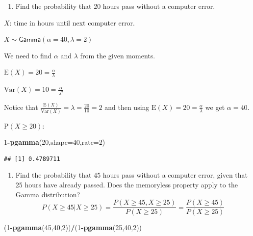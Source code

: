 \documentclass[
]{book}
\newenvironment{Shaded}{\begin{snugshade}}{\end{snugshade}}
\newcommand{\DataTypeTok}[1]{\textcolor[rgb]{0.13,0.29,0.53}{#1}}
\newcommand{\DecValTok}[1]{\textcolor[rgb]{0.00,0.00,0.81}{#1}}
\newcommand{\KeywordTok}[1]{\textcolor[rgb]{0.13,0.29,0.53}{\textbf{#1}}}
\newcommand{\NormalTok}[1]{#1}
\newcommand{\OperatorTok}[1]{\textcolor[rgb]{0.81,0.36,0.00}{\textbf{#1}}}
\providecommand{\tightlist}{%
  \setlength{\itemsep}{0pt}\setlength{\parskip}{0pt}}
\begin{document}
\begin{enumerate}
\def\labelenumi{\alph{enumi}.}
\tightlist
\item
  Find the probability that 20 hours pass without a computer error.
\end{enumerate}

\(X\): time in hours until next computer error.

\(X\sim \textsf{Gamma}(\alpha = 40, \lambda = 2)\)

We need to find \(\alpha\) and \(\lambda\) from the given moments.

\(\mbox{E}(X) = 20 = \frac{\alpha}{\lambda}\)

\(\mbox{Var}(X) = 10 = \frac{\alpha}{\lambda^2}\)

Notice that \(\frac{\mbox{E}(X)}{\mbox{Var}(X)} = \lambda = \frac{20}{10}=2\) and then using \(\mbox{E}(X) = 20 = \frac{\alpha}{\lambda}\) we get \(\alpha = 40\).

\(\mbox{P}(X\geq 20)\):

\begin{Shaded}
\begin{Highlighting}[]
\DecValTok{1}\OperatorTok{-}\KeywordTok{pgamma}\NormalTok{(}\DecValTok{20}\NormalTok{,}\DataTypeTok{shape=}\DecValTok{40}\NormalTok{,}\DataTypeTok{rate=}\DecValTok{2}\NormalTok{)}
\end{Highlighting}
\end{Shaded}

\begin{verbatim}
## [1] 0.4789711
\end{verbatim}

\begin{enumerate}
\def\labelenumi{\alph{enumi}.}
\setcounter{enumi}{1}
\tightlist
\item
  Find the probability that 45 hours pass without a computer error, given that 25 hours have already passed. Does the memoryless property apply to the Gamma distribution?
  \[
  P(X\geq 45|X\geq 25) = \frac{P(X\geq 45, X\geq 25)}{P(X\geq 25)} = \frac{P(X\geq 45)}{P(X\geq 25)}
  \]
\end{enumerate}

\begin{Shaded}
\begin{Highlighting}[]
\NormalTok{(}\DecValTok{1}\OperatorTok{-}\KeywordTok{pgamma}\NormalTok{(}\DecValTok{45}\NormalTok{,}\DecValTok{40}\NormalTok{,}\DecValTok{2}\NormalTok{))}\OperatorTok{/}\NormalTok{(}\DecValTok{1}\OperatorTok{-}\KeywordTok{pgamma}\NormalTok{(}\DecValTok{25}\NormalTok{,}\DecValTok{40}\NormalTok{,}\DecValTok{2}\NormalTok{))}
\end{Highlighting}
\end{Shaded}
\end{document}
